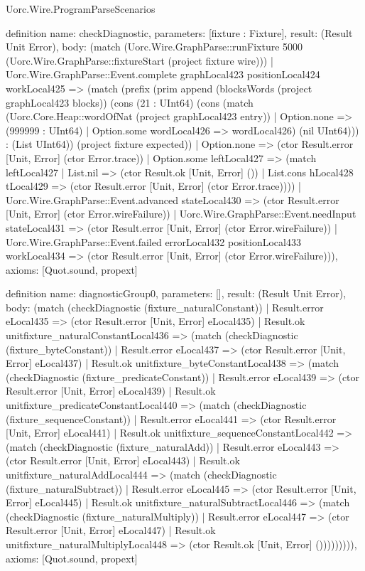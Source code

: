 \begin{lexlean}{Uorc.Wire.ProgramParseScenarios}
\begin{semanticmodule}
definition{
  name: checkDiagnostic,
  parameters: [fixture : Fixture],
  result: (Result Unit Error),
  body: (match (Uorc.Wire.GraphParse::runFixture 5000 (Uorc.Wire.GraphParse::fixtureStart (project fixture wire)))
    | Uorc.Wire.GraphParse::Event.complete graphLocal423 positionLocal424 workLocal425 => (match (prefix (prim append (blocksWords (project graphLocal423 blocks)) (cons (21 : UInt64) (cons (match (Uorc.Core.Heap::wordOfNat (project graphLocal423 entry))
        | Option.none => (999999 : UInt64)
        | Option.some wordLocal426 => wordLocal426) (nil UInt64))) : (List UInt64)) (project fixture expected))
      | Option.none => (ctor Result.error [Unit, Error] (ctor Error.trace))
      | Option.some leftLocal427 => (match leftLocal427
        | List.nil => (ctor Result.ok [Unit, Error] ())
        | List.cons hLocal428 tLocal429 => (ctor Result.error [Unit, Error] (ctor Error.trace))))
    | Uorc.Wire.GraphParse::Event.advanced stateLocal430 => (ctor Result.error [Unit, Error] (ctor Error.wireFailure))
    | Uorc.Wire.GraphParse::Event.needInput stateLocal431 => (ctor Result.error [Unit, Error] (ctor Error.wireFailure))
    | Uorc.Wire.GraphParse::Event.failed errorLocal432 positionLocal433 workLocal434 => (ctor Result.error [Unit, Error] (ctor Error.wireFailure))),
  axioms: [Quot.sound, propext]
}

definition{
  name: diagnosticGroup0,
  parameters: [],
  result: (Result Unit Error),
  body: (match (checkDiagnostic (fixture_naturalConstant))
    | Result.error eLocal435 => (ctor Result.error [Unit, Error] eLocal435)
    | Result.ok unitfixture_naturalConstantLocal436 => (match (checkDiagnostic (fixture_byteConstant))
      | Result.error eLocal437 => (ctor Result.error [Unit, Error] eLocal437)
      | Result.ok unitfixture_byteConstantLocal438 => (match (checkDiagnostic (fixture_predicateConstant))
        | Result.error eLocal439 => (ctor Result.error [Unit, Error] eLocal439)
        | Result.ok unitfixture_predicateConstantLocal440 => (match (checkDiagnostic (fixture_sequenceConstant))
          | Result.error eLocal441 => (ctor Result.error [Unit, Error] eLocal441)
          | Result.ok unitfixture_sequenceConstantLocal442 => (match (checkDiagnostic (fixture_naturalAdd))
            | Result.error eLocal443 => (ctor Result.error [Unit, Error] eLocal443)
            | Result.ok unitfixture_naturalAddLocal444 => (match (checkDiagnostic (fixture_naturalSubtract))
              | Result.error eLocal445 => (ctor Result.error [Unit, Error] eLocal445)
              | Result.ok unitfixture_naturalSubtractLocal446 => (match (checkDiagnostic (fixture_naturalMultiply))
                | Result.error eLocal447 => (ctor Result.error [Unit, Error] eLocal447)
                | Result.ok unitfixture_naturalMultiplyLocal448 => (ctor Result.ok [Unit, Error] ())))))))),
  axioms: [Quot.sound, propext]
}


\end{semanticmodule}
\end{lexlean}

